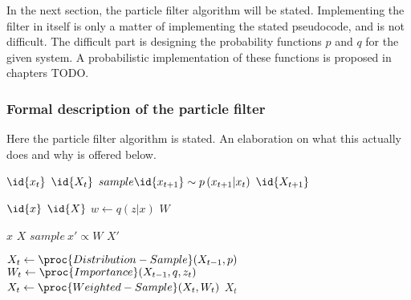 In the next section, the particle filter algorithm will be stated. Implementing the filter in itself is only a matter of implementing the stated pseudocode, and is not difficult. The difficult part is designing the probability functions $p$ and $q$ for the given system. A probabilistic implementation of these functions is proposed in chapters TODO.


\subsubsection{Formal description of the particle filter}
Here the particle filter algorithm is stated. An elaboration on what this actually does and why is offered below.

\begin{codebox}
\li \ForEach $\id{x_t}$ \In $\id{X_t}$
\li     \Do
            $sample \id{x_{t+1}} \sim p\left(x_{t+1}|x_t\right)$
        \End
\li \Return $\id{X_{t+1}}$
\end{codebox}
\begin{codebox}
\li \ForEach $\id{x}$ \In $\id{X}$ 
\li     \Do
            $w \gets q\left(z|x\right)$
        \End
\li \Return $W$
\end{codebox}
\begin{codebox}
\li \ForEach $x$ \In $X$
\li     \Do
            $sample ~ x' \propto W$   
        \End
\li \Return $X'$
\end{codebox}
\begin{codebox}
\li $X_t \gets \proc{Distribution-Sample}(X_{t-1},p)$
\li $W_t \gets \proc{Importance}(X_{t-1},q,z_t)$
\li $X_t \gets \proc{Weighted-Sample}(X_t,W_t)$
\li \Return $X_t$
\end{codebox}



